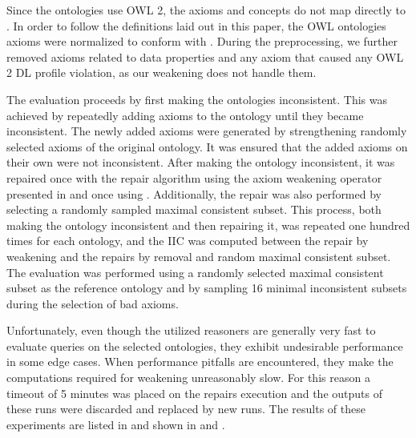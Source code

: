\documentclass[
]{ceurart}
\begin{document}
Since the ontologies use OWL 2, the axioms and concepts do not map directly to \SROIQ. In order to follow the definitions laid out in this paper, the OWL ontologies axioms were normalized to conform with \SROIQ. During the preprocessing, we further removed axioms related to data properties and any axiom that caused any OWL 2 DL profile violation, as our weakening does not handle them.

The evaluation proceeds by first making the ontologies inconsistent. This was achieved by repeatedly adding axioms to the ontology until they became inconsistent. The newly added axioms were generated by strengthening randomly selected axioms of the original ontology. It was ensured that the added axioms on their own were not inconsistent. After making the ontology inconsistent, it was repaired once with the repair algorithm using the axiom weakening operator presented in  and once using . Additionally, the repair was also performed by selecting a randomly sampled maximal consistent subset. This process, both making the ontology inconsistent and then repairing it, was repeated one hundred times for each ontology, and the IIC was computed between the repair by weakening and the repairs by removal and random maximal consistent subset. The evaluation was performed using a randomly selected maximal consistent subset as the reference ontology and by sampling 16 minimal inconsistent subsets during the selection of bad axioms.

Unfortunately, even though the utilized reasoners are generally very fast to evaluate queries on the selected ontologies, they exhibit undesirable performance in some edge cases. When performance pitfalls are encountered, they make the computations required for weakening unreasonably slow. For this reason a timeout of 5 minutes was placed on the repairs execution and the outputs of these runs were discarded and replaced by new runs. The results of these experiments are listed in  and shown in  and .
\end{document}
